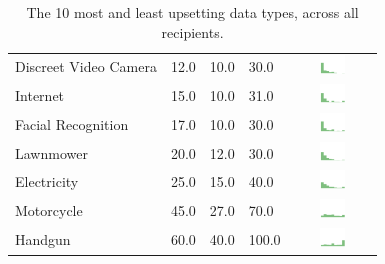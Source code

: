 \begin{table}[t]
\begin{center}
\begin{tabular}{| p{2cm} | p{1cm} | p{1cm} | p{1cm} | c |}
Discreet Video Camera & 12.0 & 10.0 & 30.0 & \includegraphics[width = 2cm, height = 0.5cm]{tex-inputs/table-images/discreetvideocamerarisk} \\ 
Internet & 15.0 & 10.0 & 31.0 & \includegraphics[width = 2cm, height = 0.5cm]{tex-inputs/table-images/internetrisk} \\ 
Facial Recognition & 17.0 & 10.0 & 30.0 & \includegraphics[width = 2cm, height = 0.5cm]{tex-inputs/table-images/facialrecognitionrisk} \\ 
Lawnmower & 20.0 & 12.0 & 30.0 & \includegraphics[width = 2cm, height = 0.5cm]{tex-inputs/table-images/LawnmowerRisk} \\ 
Electricity & 25.0 & 15.0 & 40.0 & \includegraphics[width = 2cm, height = 0.5cm]{tex-inputs/table-images/ElectricityRisk} \\ 
Motorcycle & 45.0 & 27.0 & 70.0 & \includegraphics[width = 2cm, height = 0.5cm]{tex-inputs/table-images/MotorcycleRisk} \\ 
Handgun & 60.0 & 40.0 & 100.0 & \includegraphics[width = 2cm, height = 0.5cm]{tex-inputs/table-images/HandgunRisk} \\ 
\hline
\end{tabular}
\caption{The 10 most and least upsetting data types, across all recipients.}
\label{top10}
\end{center}
\end{table}

